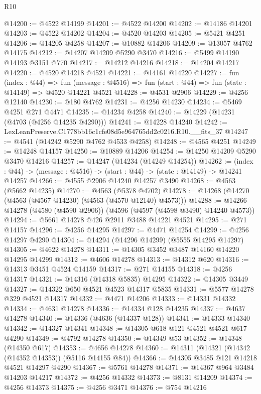 \begin{lexlean}{R10}
\begin{coremodule}
@14200 := @4522 @14199
@14201 := @4522 @14200
@14202 := @14186 @14201
@14203 := @4522 @14202
@14204 := @4520 @14203
@14205 := @5421 @4251
@14206 := @14205 @4258
@14207 := @10882 @14206
@14209 := @13057 @4762 @14175
@14212 := @14207 @14209 @5290 @3470
@14216 := @5499 @14190 @14193 @3151 @770
@14217 := @14212 @14216
@14218 := @14204 @14217
@14220 := @4520 @14218 @4521
@14221 := @14161 @14220
@14227 := fun (index : @44) =>
  fun (message : @4516) => fun (start : @44) => fun (state : @14149) => @4520 @14221 @4521
@14228 := @4531 @2906
@14229 := @4256 @12140
@14230 := @180 @4762
@14231 := @4256 @14230
@14234 := @5469 @4251 @271 @4471
@14235 := @14234 @4258
@14240 := @14229 (@14231 (@4703 (@4256 @14235 @4290)))
@14241 := @14228 @14240
@14242 := LexLeanPreserve.C1778bb16c1cfe08d5e964765dd2c0216.R10.__fits_37
@14247 := @4541 (@14242 @5290 @4762 @4533 @4258)
@14248 := @4565 @4251
@14249 := @14248 @14157
@14250 := @10889 @14206
@14254 := @14250 @14209 @5290 @3470 @14216
@14257 := @14247 (@14234 (@14249 @14254))
@14262 := (index : @44) -> (message : @4516) -> (start : @44) -> (state : @14149) -> @14241 @14257
@14266 := @4555 @2906 @14240 @14257 @3490
@14268 := @4563 (@5662 @14235)
@14270 := @4563 (@5378 @4702)
@14278 := @14268 (@14270 (@4563 (@4567 @14230) (@4563 (@4570 @12140) @4573)))
@14288 := @14266 @14278 (@4580 (@4590 @2906)) (@4596 (@4597 (@4598 @3490) @14240 @4573))
@14294 := @5661 @14278 @426 @2911 @3488 @14221 @4521
@14295 := @271 @14157
@14296 := @4256 @14295
@14297 := @4471 @14254
@14299 := @4256 @14297 @4290
@14304 := @14294 (@14296 @14299) (@5555 @14295 @14297)
@14305 := @4622 @14278
@14311 := @14305 @3452 @3487 @14160 @14220 @14295 @14299
@14312 := @4606 @14278
@14313 := @14312 @620
@14316 := @14313 @3451 @4524 @14159
@14317 := @271 @14155
@14318 := @4256 @14317
@14321 := @14316 (@14318 @5835) @14295
@14322 := @14305 @3449
@14327 := @14322 @650 @4521 @4523 @14317 @5835
@14331 := @5577 @14278 @329 @4521 @14317
@14332 := @4471 @14206
@14333 := @14331 @14332
@14334 := @4631 @14278
@14336 := @14334 @128 @14235
@14337 := @4637 @14278
@14340 := @14336 (@4636 (@14337 @128))
@14341 := @14333 @14340
@14342 := @14327 @14341
@14348 := @14305 @618 @121 @4521 @4521 @617 @4290
@14349 := @4792 @14278
@14350 := @14349 @53
@14352 := @14348 (@14350 @617)
@14353 := @4656 @14278
@14360 := @14311 (@14321 (@14342 (@14352 @14353)) (@5116 @14155 @84))
@14366 := @14305 @3485 @121 @14218 @4521 @14297 @4290
@14367 := @5761 @14278
@14371 := @14367 @964 @3484 @14203 @14217
@14372 := @4256 @14332
@14373 := @8131 @14209
@14374 := @4256 @14373
@14375 := @4256 @3471
@14376 := @754 @14216

\end{coremodule}
\end{lexlean}
